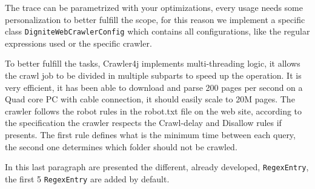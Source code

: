 \documentclass[
	a4paper,					10pt,							twoside,					openright,				notitlepage,			parskip=half,			]{scrreprt}
\begin{document}
The trace can be parametrized with your optimizations, every usage needs some personalization to better fulfill 
the scope, for this reason we implement a specific class \verb|DigniteWebCrawlerConfig| which contains all 
configurations, like the regular expressions used or the specific crawler.

To better fulfill the tasks, Crawler4j implements multi-threading logic, it allows the crawl job to be 
divided in multiple subparts to speed up the operation. It is very efficient, it has been able to download 
and parse 200 pages per second on a Quad core PC with cable connection\cite{page:java-source}, it should 
easily scale to 20M pages.
The crawler follows the robot rules in the robot.txt file on the web site, according to the specification 
the crawler respects the Crawl-delay and Disallow rules if presents. The first rule defines what is the 
minimum time between each query, the second one determines which folder should not be crawled.

In this last paragraph are presented the different, already developed, \verb|RegexEntry|,
the first 5 \verb|RegexEntry| are added by default.
\end{document}
